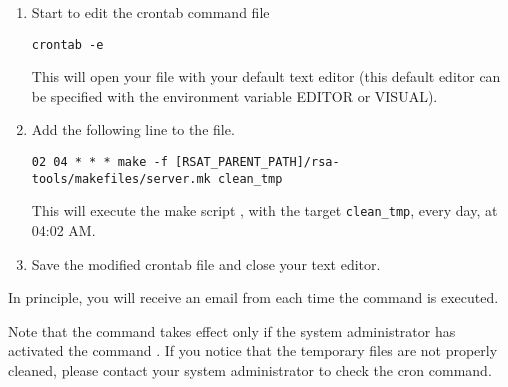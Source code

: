 \documentclass[12pt,a4paper, twoside]{scrreprt} %
\begin{document}
\begin{enumerate}
\item Start to edit the crontab command file

\begin{lstlisting}
crontab -e
\end{lstlisting}

This will open your  file with your default text editor
(this default editor can be specified with the environment variable
EDITOR or VISUAL).

\item Add the following line to the  file. 

\begin{lstlisting}
02 04 * * * make -f [RSAT_PARENT_PATH]/rsa-tools/makefiles/server.mk clean_tmp
\end{lstlisting}

This will execute the make script , with the target
\texttt{clean\_tmp}, every day, at 04:02 AM. 

\item Save the modified crontab file and close your text editor.

\end{enumerate}

In principle, you will receive an email from  each
time the command is executed.

Note that the command  takes effect only if the
system administrator has activated the command . If you
notice that the temporary files are not properly cleaned, please
contact your system administrator to check the cron command.
\end{document}
